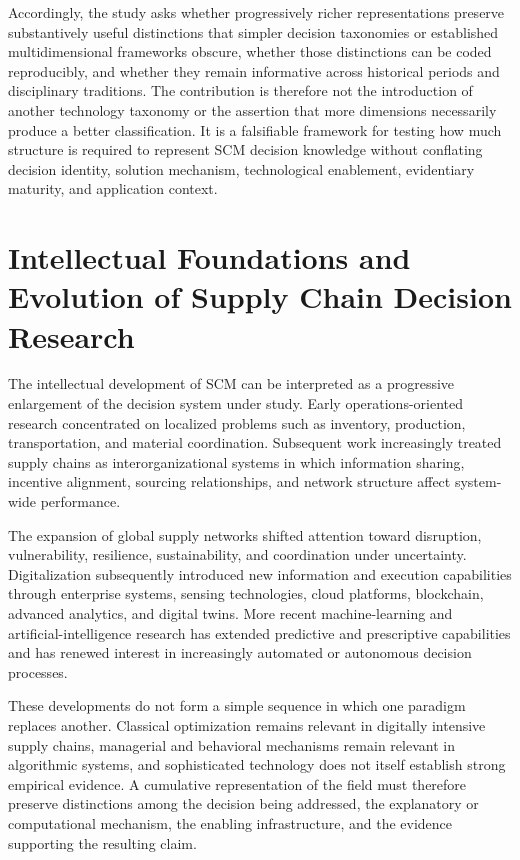 \documentclass[journal]{IEEEtran}
\begin{document}
Accordingly, the study asks whether progressively richer representations preserve substantively useful distinctions that simpler decision taxonomies or established multidimensional frameworks obscure, whether those distinctions can be coded reproducibly, and whether they remain informative across historical periods and disciplinary traditions. The contribution is therefore not the introduction of another technology taxonomy or the assertion that more dimensions necessarily produce a better classification. It is a falsifiable framework for testing how much structure is required to represent SCM decision knowledge without conflating decision identity, solution mechanism, technological enablement, evidentiary maturity, and application context.

\section{Intellectual Foundations and Evolution of Supply Chain Decision Research}
The intellectual development of SCM can be interpreted as a progressive enlargement of the decision system under study. Early operations-oriented research concentrated on localized problems such as inventory, production, transportation, and material coordination. Subsequent work increasingly treated supply chains as interorganizational systems in which information sharing, incentive alignment, sourcing relationships, and network structure affect system-wide performance.

The expansion of global supply networks shifted attention toward disruption, vulnerability, resilience, sustainability, and coordination under uncertainty. Digitalization subsequently introduced new information and execution capabilities through enterprise systems, sensing technologies, cloud platforms, blockchain, advanced analytics, and digital twins. More recent machine-learning and artificial-intelligence research has extended predictive and prescriptive capabilities and has renewed interest in increasingly automated or autonomous decision processes.

These developments do not form a simple sequence in which one paradigm replaces another. Classical optimization remains relevant in digitally intensive supply chains, managerial and behavioral mechanisms remain relevant in algorithmic systems, and sophisticated technology does not itself establish strong empirical evidence. A cumulative representation of the field must therefore preserve distinctions among the decision being addressed, the explanatory or computational mechanism, the enabling infrastructure, and the evidence supporting the resulting claim.
\end{document}
